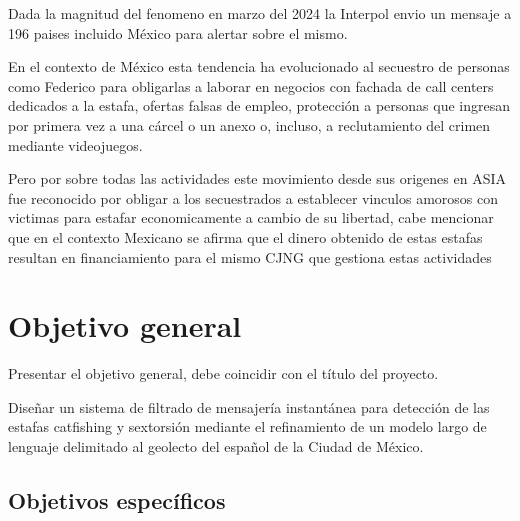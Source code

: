Dada la magnitud del fenomeno en marzo del 2024 la Interpol envio un mensaje a 196 paises incluido México para alertar sobre el mismo.

En el contexto de México esta tendencia ha evolucionado al secuestro de personas como Federico para obligarlas a laborar en negocios con fachada de call centers dedicados a la estafa, ofertas falsas de empleo, protección a personas que ingresan por primera vez a una cárcel o un anexo o, incluso, a reclutamiento del crimen mediante videojuegos.

Pero por sobre todas las actividades este movimiento desde sus origenes en ASIA fue reconocido por obligar a los secuestrados a establecer vinculos amorosos con victimas para estafar economicamente a cambio de su libertad, cabe mencionar que en el contexto Mexicano se afirma que el dinero obtenido de estas estafas resultan en financiamiento para el mismo CJNG que gestiona estas actividades
\cite{milenio2024cjng}


\section{Objetivo general}
Presentar el objetivo general, debe coincidir con el título del proyecto.


Diseñar un sistema de filtrado de mensajería instantánea para detección de las estafas catfishing y sextorsión mediante el refinamiento de un modelo largo de lenguaje delimitado al geolecto del español de la Ciudad de México.







\subsection{Objetivos específicos}

